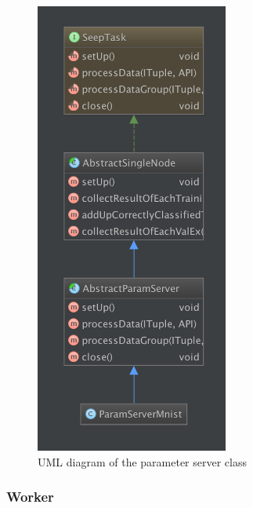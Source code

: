\documentclass[12pt]{article}
\begin{document}
\begin{figure}[H]
  \centering
  \includegraphics[width=2.5in]{parameterserveruml}
  \caption[]{UML diagram of the parameter server class}
  \label{ParameterServerUML}
\end{figure}

\subsubsection{Worker}
\end{document}
